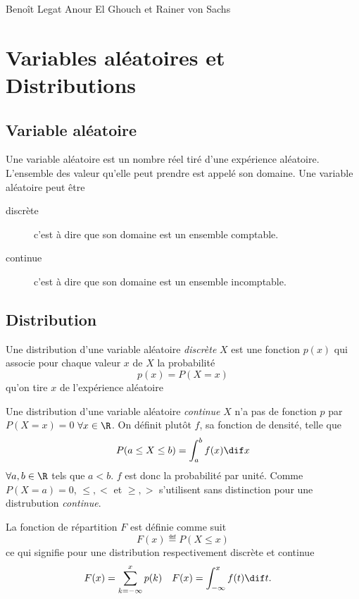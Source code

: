 

\def\Perp{\perp\!\!\!\perp}

\renewcommand{\E}{\mathbb{E}}
\newcommand{\N}{\mathcal{N}}
\DeclareMathOperator{\var}{\mathbb{V}ar}
\DeclareMathOperator{\cov}{Cov}
\DeclareMathOperator{\bias}{Bias}
\DeclareMathOperator{\mse}{MSE}

\DeclareMathOperator{\bin}{Bin}
\DeclareMathOperator{\expo}{Expo}
\DeclareMathOperator{\gammad}{Gamma}
\DeclareMathOperator{\po}{Po}

{Benoît Legat}
{Anour El Ghouch et Rainer von Sachs}

\section{Variables aléatoires et Distributions}
\subsection{Variable aléatoire}
Une variable aléatoire est un nombre réel tiré d'une expérience aléatoire.
L'ensemble des valeur qu'elle peut prendre est appelé son domaine.
Une variable aléatoire peut être
\begin{description}
  \item[discrète]
    c'est à dire que son domaine est un ensemble comptable.
  \item[continue]
    c'est à dire que son domaine est un ensemble incomptable.
\end{description}

\subsection{Distribution}
Une distribution d'une variable aléatoire \emph{discrète} $X$ est une fonction $p(x)$ qui associe pour
chaque valeur $x$ de $X$ la probabilité
\[ p(x) = P(X = x) \]
qu'on tire $x$ de l'expérience aléatoire

Une distribution d'une variable aléatoire \emph{continue} $X$ n'a pas de fonction $p$ par $P(X = x) = 0$
$\forall x \in \R$.
On définit plutôt $f$, sa fonction de densité, telle que
\[ P(a \leq X \leq b) = \int_a^b f(x) \dif x \]
$\forall a, b \in \R$ tels que $a < b$.
$f$ est donc la probabilité par unité.
Comme $P(X = a) = 0$, $\leq, <$ et $\geq, >$ s'utilisent sans distinction pour une distrubution \emph{continue}.

La fonction de répartition $F$ est définie comme suit
\[ F(x) \eqdef P(X \leq x) \]
ce qui signifie pour une distribution respectivement discrète et continue
\begin{align*}
  F(x) & = \sum_{k = -\infty}^x p(k) & F(x) & = \int_{-\infty}^x f(t) \dif t.
\end{align*}


